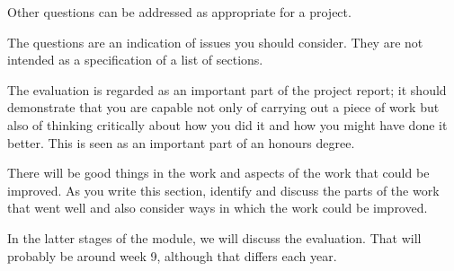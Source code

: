 Other questions can be addressed as appropriate for a project. 

The questions are an indication of issues you should consider. They are not intended as a specification of a list of sections.

The evaluation is regarded as an important part of the project report; it should demonstrate that you are capable not only of carrying out a piece of work but also of thinking critically about how you did it and how you might have done it better. This is seen as an important part of an honours degree. 

There will be good things in the work and aspects of the work that could be improved. As you write this section, identify and discuss the parts of the work that went well and also consider ways in which the work could be improved. 

In the latter stages of the module, we will discuss the evaluation. That will probably be around week 9, although that differs each year. 